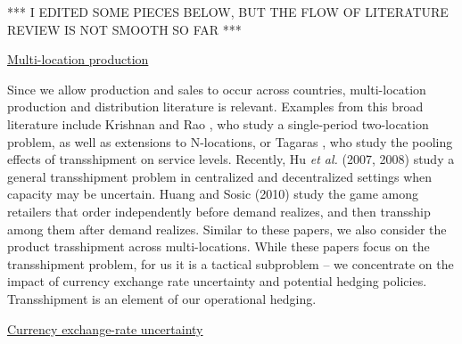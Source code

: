 \documentclass[mnsc,nonblindrev,copyedit]{informs2_wz} %
\begin{document}
*** I EDITED SOME PIECES BELOW, BUT THE FLOW OF LITERATURE REVIEW IS NOT SMOOTH SO FAR ***






\medskip
\noindent \underline{Multi-location production}

Since we allow production and sales to occur across countries, multi-location production and distribution literature is relevant.  Examples from this broad literature include Krishnan and Rao \cite{Krishnan1965}, who study a single-period two-location problem, as well as extensions to N-locations, or  Tagaras \cite{Tagaras1992}, who study the pooling effects of transshipment on service levels. Recently, Hu {\it et al.} (2007, 2008) study a general transshipment problem in centralized and decentralized settings when capacity may be uncertain. Huang and Sosic (2010) study the game among retailers that order independently before demand realizes, and then transship among them after demand realizes. Similar to these papers, we also consider the product trasshipment across multi-locations.  While these papers focus on the transshipment problem, for us it is a tactical subproblem  -- we concentrate on the impact of currency exchange rate uncertainty and potential hedging policies.  Transshipment is an element of our operational hedging.


\medskip
\noindent \underline{Currency exchange-rate uncertainty} 
\end{document}
